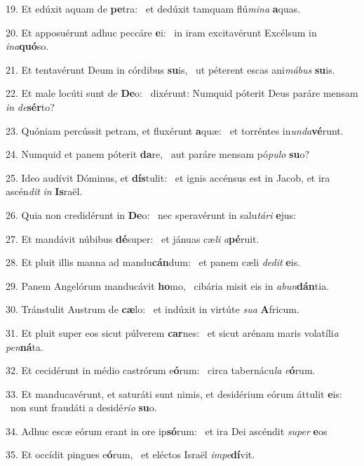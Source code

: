 19. Et edúxit aquam de \textbf{pe}tra: \ast\  et dedúxit tamquam flú\textit{mi}\textit{na} \textbf{a}quas.\

20. Et apposuérunt adhuc peccáre \textbf{e}i: \ast\  in iram excitavérunt Excélsum in \textit{in}\textit{a}\textbf{quó}so.\

21. Et tentavérunt Deum in córdibus \textbf{su}is, \ast\  ut péterent escas ani\textit{má}\textit{bus} \textbf{su}is.\

22. Et male locúti sunt de \textbf{De}o: \ast\  dixérunt: Numquid póterit Deus paráre mensam \textit{in} \textit{de}\textbf{sér}to?\

23. Quóniam percússit petram, et fluxérunt \textbf{a}quæ: \ast\  et torréntes in\textit{un}\textit{da}\textbf{vé}runt.\

24. Numquid et panem póterit \textbf{da}re, \ast\  aut paráre mensam pó\textit{pu}\textit{lo} \textbf{su}o?\

25. Ideo audívit Dóminus, et \textbf{dís}tulit: \ast\  et ignis accénsus est in Jacob, et ira ascén\textit{dit} \textit{in} \textbf{Is}raël.\

26. Quia non credidérunt in \textbf{De}o: \ast\  nec speravérunt in salu\textit{tá}\textit{ri} \textbf{e}jus:\

27. Et mandávit núbibus \textbf{dé}super: \ast\  et jánuas cæ\textit{li} \textit{a}\textbf{pé}ruit.\

28. Et pluit illis manna ad mandu\textbf{cán}dum: \ast\  et panem cæli \textit{de}\textit{dit} \textbf{e}is.\

29. Panem Angelórum manducávit \textbf{ho}mo, \ast\  cibária misit eis in \textit{ab}\textit{un}\textbf{dán}tia.\

30. Tránstulit Austrum de \textbf{cæ}lo: \ast\  et indúxit in virtúte \textit{su}\textit{a} \textbf{A}fricum.\

31. Et pluit super eos sicut púlverem \textbf{car}nes: \ast\  et sicut arénam maris volatíli\textit{a} \textit{pen}\textbf{ná}ta.\

32. Et cecidérunt in médio castrórum e\textbf{ó}rum: \ast\  circa tabernácu\textit{la} \textit{e}\textbf{ó}rum.\

33. Et manducavérunt, et saturáti sunt nimis, et desidérium eórum áttulit \textbf{e}is: \ast\  non sunt fraudáti a desidé\textit{ri}\textit{o} \textbf{su}o.\

34. Adhuc escæ eórum erant in ore ip\textbf{só}rum: \ast\  et ira Dei ascéndit \textit{su}\textit{per} \textbf{e}os\

35. Et occídit pingues e\textbf{ó}rum, \ast\  et eléctos Israël \textit{im}\textit{pe}\textbf{dí}vit.\

